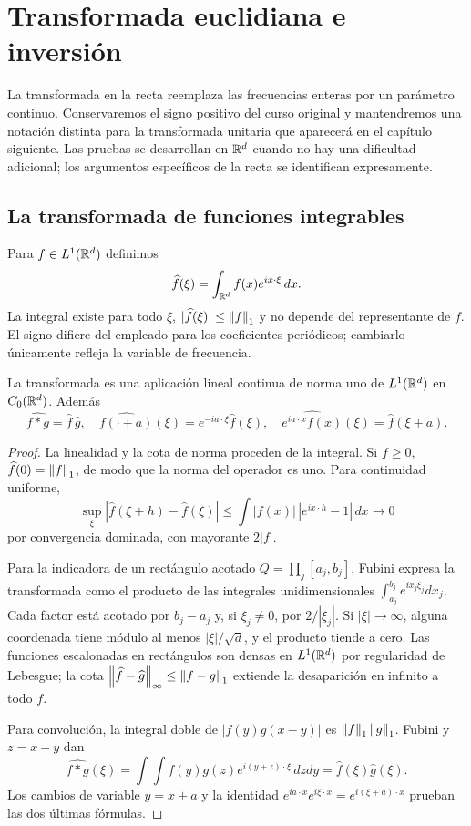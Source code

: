\chapter{Transformada euclidiana e inversión}\label{cap:v4-07}
La transformada en la recta reemplaza las frecuencias enteras por un parámetro continuo. Conservaremos el signo positivo del curso original y mantendremos una notación distinta para la transformada unitaria que aparecerá en el capítulo siguiente. Las pruebas se desarrollan en $\mathbb R^d$ cuando no hay una dificultad adicional; los argumentos específicos de la recta se identifican expresamente.

\section{La transformada de funciones integrables}\label{lectura:v4-10}
Para $f\in L^1(\mathbb R^d)$ definimos
\[
 \widehat f(\xi)=\int_{\mathbb R^d}f(x)e^{ix\cdot\xi}\,dx.
\]
La integral existe para todo $\xi$, $|\widehat f(\xi)|\leq\left\lVert f\right\rVert_1$ y no depende del representante de $f$. El signo difiere del empleado para los coeficientes periódicos; cambiarlo únicamente refleja la variable de frecuencia.
\begin{teorema}\label{v4:fourier-L1}
La transformada es una aplicación lineal continua de norma uno de $L^1(\mathbb R^d)$ en $C_0(\mathbb R^d)$. Además
\[
 \widehat{f*g}=\widehat f\,\widehat g,\quad
 \widehat{f(\cdot+a)}(\xi)=e^{-ia\cdot\xi}\widehat f(\xi),\quad
 \widehat{e^{ia\cdot x}f(x)}(\xi)=\widehat f(\xi+a).
\]
\end{teorema}
\begin{proof}
La linealidad y la cota de norma proceden de la integral. Si $f\geq0$, $\widehat f(0)=\left\lVert f\right\rVert_1$, de modo que la norma del operador es uno. Para continuidad uniforme,
\[
 \sup_\xi|\widehat f(\xi+h)-\widehat f(\xi)|
 \leq\int|f(x)|\,|e^{ix\cdot h}-1|\,dx\longrightarrow0
\]
por convergencia dominada, con mayorante $2|f|$.

Para la indicadora de un rectángulo acotado $Q=\prod_j[a_j,b_j]$, Fubini expresa la transformada como el producto de las integrales unidimensionales $\int_{a_j}^{b_j}e^{ix_j\xi_j}dx_j$. Cada factor está acotado por $b_j-a_j$ y, si $\xi_j\ne0$, por $2/|\xi_j|$. Si $|\xi|\to\infty$, alguna coordenada tiene módulo al menos $|\xi|/\sqrt d$, y el producto tiende a cero. Las funciones escalonadas en rectángulos son densas en $L^1(\mathbb R^d)$ por regularidad de Lebesgue; la cota $\left\lVert\widehat f-\widehat g\right\rVert_\infty\leq\left\lVert f-g\right\rVert_1$ extiende la desaparición en infinito a todo $f$.

Para convolución, la integral doble de $|f(y)g(x-y)|$ es $\left\lVert f\right\rVert_1\left\lVert g\right\rVert_1$. Fubini y $z=x-y$ dan
\[
 \widehat{f*g}(\xi)=\int\int f(y)g(z)e^{i(y+z)\cdot\xi}\,dzdy
 =\widehat f(\xi)\widehat g(\xi).
\]
Los cambios de variable $y=x+a$ y la identidad $e^{ia\cdot x}e^{i\xi\cdot x}=e^{i(\xi+a)\cdot x}$ prueban las dos últimas fórmulas.
\end{proof}

